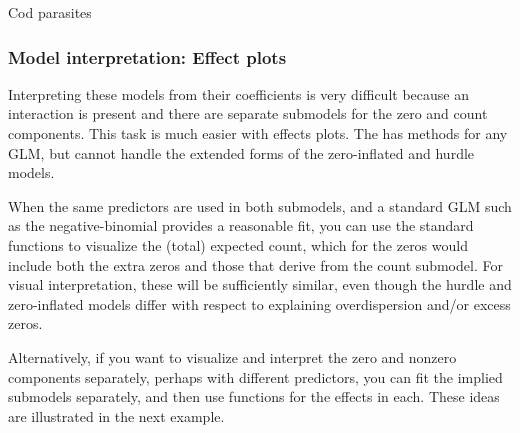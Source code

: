 \documentclass[11pt]{book}\usepackage[]{graphicx}\usepackage[]{color}
\begin{document}
\begin{Example}[cod2]{Cod parasites}
\end{Example}

\subsubsection{Model interpretation: Effect plots}

Interpreting these models from their coefficients is very difficult because an interaction
is present and there are separate submodels for the zero and count components.
This task is much easier with effects plots.
The  has methods for any GLM, but cannot handle the extended forms of
the zero-inflated and hurdle models.  

When the same predictors are used in both
submodels, and a standard GLM such as the negative-binomial provides a reasonable
fit, you can use the standard  functions to visualize the (total)
expected count, which for the zeros would include both the extra zeros and
those that derive from the count submodel.  For visual interpretation, these will
be sufficiently similar, even though the hurdle and zero-inflated models differ
with respect to explaining overdispersion and/or excess zeros.

Alternatively, if you want to visualize and interpret the zero and nonzero components
separately, perhaps with different predictors, you can fit the implied submodels
separately, and then use  functions for the effects in each.
These ideas are illustrated in the next example.
\end{document}
